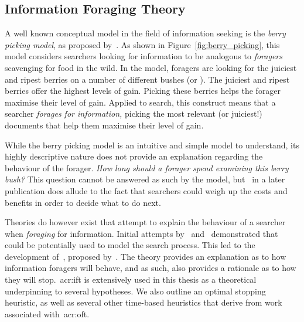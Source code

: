\subsection{Information Foraging Theory}\label{sec:stopping_background:theoretical:ift}
A well known conceptual model in the field of information seeking is the \emph{berry picking model}, as proposed by~\cite{bates1989berry_picking}. As shown in Figure~\ref{fig:berry_picking}, this model considers searchers looking for information to be analogous to \emph{foragers} scavenging for food in the wild. In the model, foragers are looking for the juiciest and ripest berries on a number of different bushes (or \emph{}). The juiciest and ripest berries offer the highest levels of gain. Picking these berries helps the forager maximise their level of gain. Applied to search, this construct means that a searcher \emph{forages for information,} picking the most relevant (or juiciest!) documents that help them maximise their level of gain.

While the berry picking model is an intuitive and simple model to understand, its highly descriptive nature does not provide an explanation regarding the behaviour of the forager. \emph{How long should a forager spend examining this berry bush?} This question cannot be answered as such by the model, but~\cite{bates1989alluding} in a later publication does allude to the fact that searchers could weigh up the costs and benefits in order to decide what to do next.

Theories do however exist that attempt to explain the behaviour of a searcher when \emph{foraging} for information. Initial attempts by~\cite{russell1993sense_making} and~\cite{sandstrom1994optimal_foraging} demonstrated that~~\citep{stephens1986foraging_theory} could be potentially used to model the search process. This led to the development of~, proposed by~\cite{pirolli1999ift}. The theory provides an explanation as to how information foragers will behave, and as such, also provides a rationale as to how they will stop.~\gls{acr:ift} is extensively used in this thesis as a theoretical underpinning to several hypotheses. We also outline an optimal stopping heuristic, as well as several other time-based heuristics that derive from work associated with~\gls{acr:oft}.

